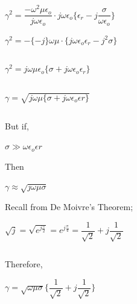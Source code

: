 $\gamma^{2}=\dfrac{-\omega^{2}\mu\epsilon_{o}}{j\omega\epsilon_{o}}\cdot j\omega\epsilon_{o}\Bigg\{\epsilon_{r}-j\dfrac{\sigma}{\omega\epsilon_{o}}\Bigg\}$
\begin{equation}\end{equation}

\begin{center}
$\gamma^{2}=-\{-j\}\omega\mu\cdot\{j\omega\epsilon_{o}\epsilon_{r}-j^{2}\sigma\}$
\end{center}
\begin{equation}\end{equation}

\begin{center}
$\gamma^{2}=j\omega\mu\epsilon_{o}\{\sigma+j\omega\epsilon_{o}\epsilon_{r}\}$	
\end{center}
\begin{equation}\end{equation}

\begin{center}
$\gamma=\sqrt{j\omega\mu\{\sigma+j\omega\epsilon_{o}\epsilon{r}\}}$	
\end{center}
\begin{equation}\end{equation}

But if, 
\begin{center}
$\sigma\gg\omega\epsilon_{o}\epsilon{r}$
\end{center}

Then

$\gamma\approx\sqrt{j\omega\mu\sigma}$
\begin{equation}\end{equation}

Recall from De Moivre's Theorem;	

\begin{center}
$\sqrt{j}=\sqrt{e^{j\frac{\pi}{2}}}=e^{j\frac{\pi}{4}}=\dfrac{1}{\sqrt{2}}+j\dfrac{1}{\sqrt{2}}$
\end{center}
\begin{equation}\end{equation}

Therefore,

\begin{center}		
$\gamma = \sqrt{\omega\mu\sigma}\{\dfrac{1}{\sqrt{2}}+j\dfrac{1}{\sqrt{2}}\}$
\end{center}
\begin{equation}\end{equation}

